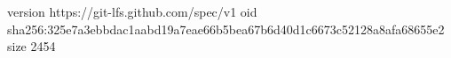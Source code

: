 version https://git-lfs.github.com/spec/v1
oid sha256:325e7a3ebbdac1aabd19a7eae66b5bea67b6d40d1c6673c52128a8afa68655e2
size 2454
